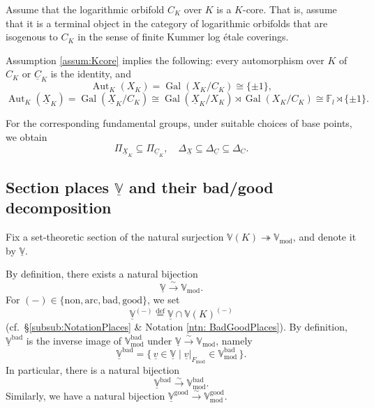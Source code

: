 \documentclass[12pt, reqno, a4paper]{amsart}
\def\udl#1{\underline{#1}} %
\def\eqdef{\stackrel{\textrm{def}}{=}} %
\def\simto{\stackrel{\sim}{\rightarrow}} %
\def\simlongto{\stackrel{\sim}{\longrightarrow}} %
\def\surjto{\twoheadrightarrow}
\def\bF{\mathbb{F}} %
\def\bV{\mathbb{V}}
\def\uX{\udl{X}} %
\def\uC{\udl{C}} %
\def\uV{\udl{\bV}} %
\def\uv{\udl{v}} %
\def\bad{\mathrm{bad}}
\def\good{\mathrm{good}}
\DeclareMathOperator{\Aut}{Aut}
\DeclareMathOperator{\Gal}{Gal}
\DeclareMathOperator{\tmod}{mod}
\def\non{\mathrm{non}}
\def\arc{\mathrm{arc}}
\begin{document}
\begin{assum}[$K$-coricity of $C_K$]\label{assum:Kcore}
Assume that the logarithmic orbifold $C_K$ over $K$ is a $K$-core.
That is, assume that it is a terminal object in the category of logarithmic orbifolds that are isogenous to $C_K$ in the sense of finite Kummer log {\'e}tale coverings.
\end{assum}

\begin{rem}
Assumption \ref{assum:Kcore} implies the following: every automorphism over $K$ of $C_K$ or $\uC_K$ is the identity, and
\[
\Aut_K(X_K)=\Gal(X_K/C_K)\cong\{\pm1\},
\]
\[
\Aut_K(\uX_K)=\Gal(\uX_K/C_K)\cong\Gal(\uX_K/X_K)\rtimes\Gal(X_K/C_K)\cong\bF_l\rtimes\{\pm1\}.
\]
\end{rem}

For the corresponding fundamental groups, under suitable choices of base points, we obtain
\begin{equation*}
  \Pi_{\uX_K}\subseteq \Pi_{\uC_K},
  \quad
  \Delta_{\uX}\subseteq\Delta_{\uC}\subseteq\Delta_C.
\end{equation*}

\subsection{Section places \(\uV\) and their bad/good decomposition}
\begin{dfn}[the section places \(\uV\)]
Fix a set-theoretic section of the natural surjection $\bV(K)\surjto \bV_{\tmod}$, and denote it by \(\uV\).
\end{dfn}

By definition, there exists a natural bijection
\begin{equation*}
  \uV\simlongto \bV_{\tmod}.
\end{equation*}
For \((-)\in \{\non,\arc,\bad,\good\}\), we set
\[
  \uV^{(-)}  \eqdef \uV\cap\bV(K)^{(-)}
\]
(cf.\ \S\ref{subsub:NotationPlaces} \& Notation \ref{ntn: BadGoodPlaces}).
By definition, \(\uV^{\bad}\) is the inverse image of \(\bV^{\bad}_{\tmod}\) under \(\uV\simto\bV_{\tmod}\), namely
\begin{equation*}
  \uV^{\bad}
  =
  \{\,\uv\in\uV\mid \uv|_{F_{\tmod}}\in\bV^{\bad}_{\tmod}\,\}.
\end{equation*}
In particular, there is a natural bijection
\begin{equation*}
  \uV^{\bad}\simlongto \bV^{\bad}_{\tmod}.
\end{equation*}
Similarly, we have a natural bijection \(\uV^{\good}\simto\bV^{\good}_{\tmod}\).
\end{document}
